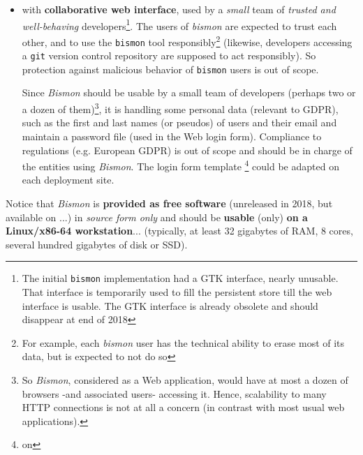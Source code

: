 \begin{itemize}
    \item with \textbf{collaborative web interface}, used by a
      \emph{small} team of \emph{trusted and well-behaving}
      developers\footnote{The initial \texttt{bismon} implementation
        had a GTK interface, nearly unusable. That interface is
        temporarily used to fill the persistent store till the web
        interface is usable. The GTK interface is already obsolete and
        should disappear at end of 2018}. The users of \emph{bismon}
      are expected to trust each other, and to use the \texttt{bismon}
      tool responsibly\footnote{For example, each \emph{bismon} user
        has the technical ability to erase most of its data, but is
        expected to not do so} (likewise, developers accessing a
      \texttt{git} version control repository are supposed to act
      responsibly). So protection against malicious behavior of
      \texttt{bismon} users is out of scope.

      Since \textit{Bismon} should be usable by a small team of
      developers (perhaps two or a dozen of them)\footnote{So
        \textit{Bismon}, considered as a Web application, would have
        at most a dozen of browsers -and associated users- accessing
        it. Hence, scalability to many HTTP connections is not at all
        a concern (in contrast with most usual web applications).}, it
      is handling some personal data (relevant to GDPR), such as the
      first and last names (or pseudos) of users and their email and
      maintain a password file (used in the Web login
      form). Compliance to regulations (e.g. European GDPR) is out of
      scope and should be in charge of the entities using
      \textit{Bismon}. The login form template \footnote{on
      }
      could be adapted on each deployment site.
\end{itemize}

Notice that \textit{Bismon} is \textbf{provided as free software}
(unreleased in 2018, but available on
 ...) in \emph{source form only} and
should be \textbf{usable} (only) \textbf{on a Linux/x86-64
  workstation}... (typically, at least 32 gigabytes of RAM, 8 cores,
several hundred gigabytes of disk or SSD).

